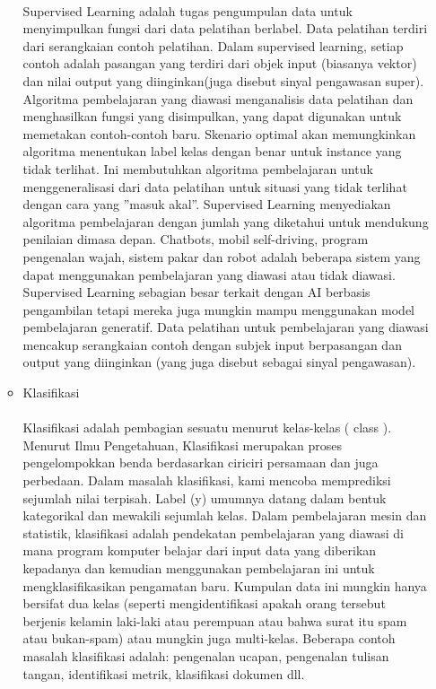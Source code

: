 \begin{enumerate}
\begin{itemize}
				\paragraph{}
				Supervised Learning adalah tugas pengumpulan data untuk menyimpulkan fungsi dari data pelatihan berlabel. Data pelatihan terdiri dari serangkaian contoh pelatihan. Dalam supervised learning, setiap contoh adalah pasangan yang terdiri dari objek input (biasanya vektor) dan nilai output yang diinginkan(juga disebut sinyal pengawasan super). Algoritma pembelajaran yang diawasi menganalisis data pelatihan dan menghasilkan fungsi yang disimpulkan, yang dapat digunakan untuk memetakan contoh-contoh baru. Skenario optimal akan memungkinkan algoritma menentukan label kelas dengan benar untuk instance yang tidak terlihat. Ini membutuhkan algoritma pembelajaran untuk menggeneralisasi dari data pelatihan untuk situasi yang tidak terlihat dengan cara yang ”masuk akal”. Supervised Learning menyediakan algoritma pembelajaran dengan jumlah yang diketahui untuk mendukung penilaian dimasa depan. Chatbots, mobil self-driving, program pengenalan wajah, sistem pakar dan robot adalah beberapa sistem yang dapat menggunakan pembelajaran yang diawasi atau tidak diawasi. Supervised Learning sebagian besar terkait dengan AI berbasis pengambilan tetapi mereka juga mungkin mampu menggunakan model pembelajaran generatif. Data pelatihan untuk pembelajaran yang diawasi mencakup serangkaian contoh dengan subjek input berpasangan dan output yang diinginkan (yang juga disebut sebagai sinyal pengawasan).
			
			\item Klasifikasi
				\paragraph{}
				Klasifikasi adalah pembagian sesuatu menurut kelas-kelas ( class ). Menurut Ilmu Pengetahuan, Klasifikasi merupakan proses pengelompokkan benda berdasarkan ciriciri persamaan dan juga perbedaan. Dalam masalah klasifikasi, kami mencoba memprediksi sejumlah nilai terpisah. Label (y) umumnya datang dalam bentuk kategorikal dan mewakili sejumlah kelas. Dalam pembelajaran mesin dan statistik, klasifikasi adalah pendekatan pembelajaran yang diawasi di mana program komputer belajar dari input data yang diberikan kepadanya dan kemudian menggunakan pembelajaran ini untuk mengklasifikasikan pengamatan baru. Kumpulan data ini mungkin hanya bersifat dua kelas (seperti mengidentifikasi apakah orang tersebut berjenis kelamin laki-laki atau perempuan atau bahwa surat itu spam atau bukan-spam) atau mungkin juga multi-kelas. Beberapa contoh masalah klasifikasi adalah: pengenalan ucapan, pengenalan tulisan tangan, identifikasi metrik, klasifikasi dokumen dll.


\end{itemize}
\end{enumerate}
